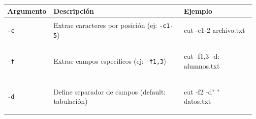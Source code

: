 \documentclass[
  spanish,
  12pt,
  letterpaper,
  DIV=11,
  numbers=noendperiod]{scrreprt}
\newenvironment{Shaded}{\begin{snugshade}}{\end{snugshade}}
\newcommand{\AttributeTok}[1]{\textcolor[rgb]{0.40,0.45,0.13}{#1}}
\newcommand{\FunctionTok}[1]{\textcolor[rgb]{0.28,0.35,0.67}{#1}}
\newcommand{\NormalTok}[1]{\textcolor[rgb]{0.00,0.23,0.31}{#1}}
\newcommand{\StringTok}[1]{\textcolor[rgb]{0.13,0.47,0.30}{#1}}
\newcounter{none} %
\begin{document}
{\def\LTcaptype{none} %
\begin{longtable}[]{@{}
  >{\raggedright\arraybackslash}p{}
  >{\raggedright\arraybackslash}p{}
  >{\raggedright\arraybackslash}p{}@{}}
\toprule\noalign{}
\begin{minipage}[b]{\linewidth}\raggedright
Argumento
\end{minipage} & \begin{minipage}[b]{\linewidth}\raggedright
Descripción
\end{minipage} & \begin{minipage}[b]{\linewidth}\raggedright
Ejemplo
\end{minipage} \\
\midrule\noalign{}
\endhead
\bottomrule\noalign{}
\endlastfoot
\texttt{-c} & Extrae caracteres por posición (ej: \texttt{-c1-5}) &
\begin{minipage}[t]{\linewidth}\raggedright
\begin{Shaded}
\begin{Highlighting}[]
\FunctionTok{cut} \AttributeTok{{-}c1{-}2}\NormalTok{ archivo.txt}
\end{Highlighting}
\end{Shaded}
\end{minipage} \\
\texttt{-f} & Extrae campos específicos (ej: \texttt{-f1,3}) &
\begin{minipage}[t]{\linewidth}\raggedright
\begin{Shaded}
\begin{Highlighting}[]
\FunctionTok{cut} \AttributeTok{{-}f1,3} \AttributeTok{{-}d:}\NormalTok{ alumnos.txt}
\end{Highlighting}
\end{Shaded}
\end{minipage} \\
\texttt{-d} & Define separador de campos (default: tabulación) &
\begin{minipage}[t]{\linewidth}\raggedright
\begin{Shaded}
\begin{Highlighting}[]
\FunctionTok{cut} \AttributeTok{{-}f2} \AttributeTok{{-}d}\StringTok{" "}\NormalTok{ datos.txt}
\end{Highlighting}
\end{Shaded}
\end{minipage} \\
\end{longtable}
}
\end{document}
